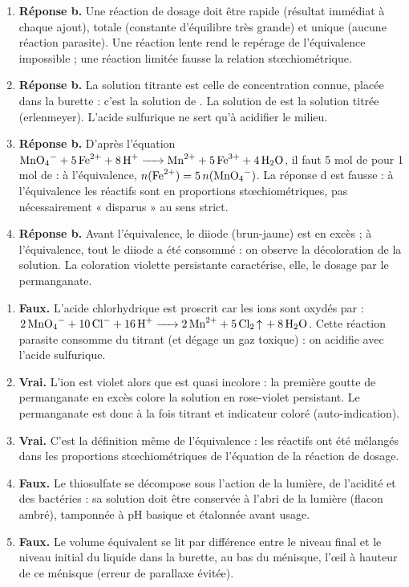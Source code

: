 \documentclass[11pt]{article}
\newcommand{\cle}[1]{{\popxbold\color{popdark}#1}}
\begin{document}
\begin{corrige}
\begin{enumerate}
\item \textbf{Réponse b.} Une réaction de dosage doit être \cle{rapide} (résultat immédiat à chaque ajout), \cle{totale} (constante d'équilibre très grande) et \cle{unique} (aucune réaction parasite). Une réaction lente rend le repérage de l'équivalence impossible ; une réaction limitée fausse la relation stœchiométrique.
\item \textbf{Réponse b.} La solution titrante est celle de concentration connue, placée dans la burette : c'est la solution de . La solution de  est la solution titrée (erlenmeyer). L'acide sulfurique ne sert qu'à acidifier le milieu.
\item \textbf{Réponse b.} D'après l'équation $\ce{MnO4- + 5Fe^2+ + 8H+ -> Mn^2+ + 5Fe^3+ + 4H2O}$, il faut 5 mol de  pour 1 mol de  : à l'équivalence, $n(\ce{Fe^2+}) = 5\,n(\ce{MnO4-})$. La réponse d est fausse : à l'équivalence les réactifs sont en proportions stœchiométriques, pas nécessairement « disparus » au sens strict.
\item \textbf{Réponse b.} Avant l'équivalence, le diiode (brun-jaune) est en excès ; à l'équivalence, tout le diiode a été consommé : on observe la \cle{décoloration} de la solution. La coloration violette persistante caractérise, elle, le dosage par le permanganate.
\end{enumerate}
\end{corrige}

\begin{corrige}
\begin{enumerate}
\item \textbf{Faux.} L'acide chlorhydrique est proscrit car les ions  sont oxydés par  : $\ce{2MnO4- + 10Cl- + 16H+ -> 2Mn^2+ + 5Cl2 ^ + 8H2O}$. Cette réaction parasite consomme du titrant (et dégage un gaz toxique) : on acidifie avec l'acide sulfurique.
\item \textbf{Vrai.} L'ion  est violet alors que  est quasi incolore : la première goutte de permanganate en excès colore la solution en rose-violet persistant. Le permanganate est donc à la fois titrant et indicateur coloré (auto-indication).
\item \textbf{Vrai.} C'est la définition même de l'équivalence : les réactifs ont été mélangés dans les proportions stœchiométriques de l'équation de la réaction de dosage.
\item \textbf{Faux.} Le thiosulfate se décompose sous l'action de la lumière, de l'acidité et des bactéries : sa solution doit être conservée à l'abri de la lumière (flacon ambré), tamponnée à pH basique et étalonnée avant usage.
\item \textbf{Faux.} Le volume équivalent se lit par différence entre le niveau final et le niveau initial du liquide dans la burette, au bas du ménisque, l'œil à hauteur de ce ménisque (erreur de parallaxe évitée).
\end{enumerate}
\end{corrige}
\end{document}
